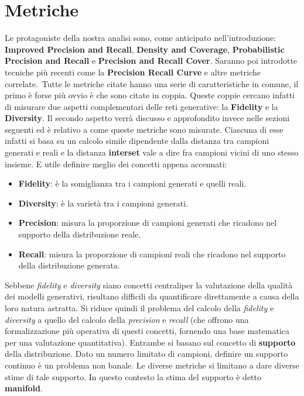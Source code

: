 \chapter{Metriche}\label{ch:chapter1}

Le protagoniste della nostra analisi sono, come anticipato nell'introduzione: 
\textbf{Improved Precision and Recall}, \textbf{Density and Coverage}, \textbf{Probabilistic Precision and Recall} e \textbf{Precision and Recall Cover}. 
Saranno poi introdotte tecniche più recenti come la \textbf{Precision Recall Curve} e altre metriche correlate.\
Tutte le metriche citate hanno una serie di caratteristiche in comune, il primo è forse più ovvio è che sono citate in coppia. 
Queste coppie cercano infatti di misurare due aspetti complementari delle reti generative: la \textbf{Fidelity} e la \textbf{Diversity}. 
Il secondo aspetto verrà discusso e approfondito invece nelle sezioni seguenti ed è relativo a come queste metriche sono misurate. Ciascuna di esse infatti 
si basa su un calcolo simile dipendente dalla distanza tra campioni generati e reali e la distanza \textbf{interset} vale a dire fra campioni vicini di uno stesso insieme.
E utile definire meglio dei concetti appena accennati: 
\begin{itemize}
    \item \textbf{Fidelity}: è la somiglianza tra i campioni generati e quelli reali.
    \item \textbf{Diversity}: è la varietà tra i campioni generati.
    \item \textbf{Precision}: misura la proporzione di campioni generati che ricadono nel supporto della distribuzione reale.
    \item \textbf{Recall}: misura la proporzione di campioni reali che ricadono nel supporto della distribuzione generata.
\end{itemize}
Sebbene \textit{fidelity} e \textit{diversity} siano concetti centraliper la valutazione della qualità dei modelli generativi, risultano difficili da quantificare direttamente a causa della loro natura astratta.
Si riduce quindi il problema del calcolo della \textit{fidelity} e \textit{diversity} a quello del calcolo della \textit{precision} e \textit{recall} (che offrono una formalizzazione più operativa di questi concetti, fornendo una base matematica per una valutazione quantitativa).
Entrambe si basano sul concetto di \textbf{supporto} della distribuzione. Dato un numero limitato di campioni, definire un supporto continuo è un problema non banale. 
Le diverse metriche si limitano a dare diverse stime di tale supporto. In questo contesto la stima del supporto è detto \textbf{manifold}.\

